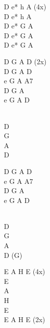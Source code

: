 \begin{chord}
\vin D e* h A (4x)\\
D e* h A\\
D e* G A\\
D e* G A\\
D e* G A

\vin D G A D (2x)\\
D G A D\\
e G A A7\\
D G A\\
e G A D

\vin \\
\vin D\\
\vin G\\
\vin A\\
\vin D

D G A D\\
e G A A7\\
D G A\\
e G A D

\vin \\
\vin D\\
\vin G\\
\vin A\\
\vin D (G)

E A H E (4x)\\
\vin E\\
\vin A\\
\vin H\\
\vin E\\
E A H E (2x)
\end{chord}
